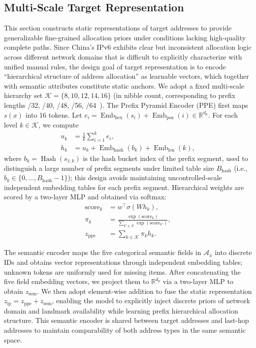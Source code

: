 \documentclass[runningheads]{llncs}
\begin{document}
\subsection{Multi-Scale Target Representation}

This section constructs static representations of target addresses to provide generalizable fine-grained allocation priors under conditions lacking high-quality complete paths. Since China's IPv6 exhibits clear but inconsistent allocation logic across different network domains that is difficult to explicitly characterize with unified manual rules, the design goal of target representation is to encode ``hierarchical structure of address allocation'' as learnable vectors, which together with semantic attributes constitute static anchors. We adopt a fixed multi-scale hierarchy set $\mathcal{K} = \{8,10,12,14,16\}$ (in nibble count, corresponding to prefix lengths /32, /40, /48, /56, /64~\cite{GB45282}). The Prefix Pyramid Encoder (PPE) first maps $s(x)$ into 16 tokens. Let $e_i=\operatorname{Emb}_{\text{hex}}(s_i)+\operatorname{Emb}_{\text{pos}}(i)\in\mathbb{R}^{d_p}$. For each level $k\in\mathcal{K}$, we compute
\begin{equation}
\begin{aligned}
u_k &= \frac{1}{k}\sum_{i=1}^{k} e_i,\\
h_k &= u_k + \operatorname{Emb}_{\text{hash}}(b_k) + \operatorname{Emb}_{\text{len}}(k),
\end{aligned}
\label{eq:ppe_encoding}
\end{equation}
where $b_k=\operatorname{Hash}(s_{1:k})$ is the hash bucket index of the prefix segment, used to distinguish a large number of prefix segments under limited table size $B_{\text{hash}}$ (i.e., $b_k\in\{0,\dots,B_{\text{hash}}-1\}$); this design avoids maintaining uncontrolled-scale independent embedding tables for each prefix segment. Hierarchical weights are scored by a two-layer MLP and obtained via softmax:
\begin{equation}
\begin{aligned}
\text{score}_k &= w^\top \sigma(W h_k),\\
\pi_k &= \frac{\exp(\text{score}_k)}{\sum_{k'\in\mathcal{K}}\exp(\text{score}_{k'})},\\
z_{\text{ppe}} &= \sum_{k\in\mathcal{K}}\pi_k h_k.
\end{aligned}
\label{eq:ppe_attention}
\end{equation}

The semantic encoder maps the five categorical semantic fields in $\mathcal{A}_x$ into discrete IDs and obtains vector representations through independent embedding tables; unknown tokens are uniformly used for missing items. After concatenating the five field embedding vectors, we project them to $\mathbb{R}^{d_p}$ via a two-layer MLP to obtain $z_{\text{sem}}$. We then adopt element-wise addition to fuse the static representation $z_{\text{ip}} = z_{\text{ppe}} + z_{\text{sem}}$, enabling the model to explicitly inject discrete priors of network domain and landmark availability while learning prefix hierarchical allocation structure. This semantic encoder is shared between target addresses and last-hop addresses to maintain comparability of both address types in the same semantic space.
\end{document}
